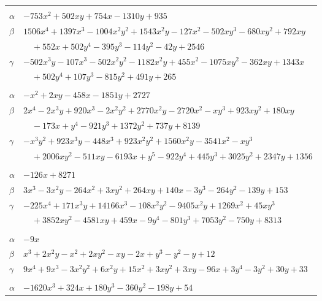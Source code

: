 \documentclass[11pt]{article}
\begin{document}
\begin{longtable}{@{}ll@{}}
\addlinespace[3pt]
\multicolumn{2}{@{}l}{$\{i,j\}=\{5,184\}$, $k_{ij}=2^{4}\cdot 3^{3}\cdot 13$}\\
$\alpha$ & $-753x^{2}+502xy+754x-1310y+935$\\
$\beta$ & $1506x^{4}+1397x^{3}-1004x^{2}y^{2}+1543x^{2}y-127x^{2}-502xy^{3}-680xy^{2}+792xy$\\
 & $\quad +552x+502y^{4}-395y^{3}-114y^{2}-42y+2546$\\
$\gamma$ & $-502x^{3}y-107x^{3}-502x^{2}y^{2}-1182x^{2}y+455x^{2}-1075xy^{2}-362xy+1343x$\\
 & $\quad +502y^{4}+107y^{3}-815y^{2}+491y+265$\\
\addlinespace[3pt]
\multicolumn{2}{@{}l}{$\{i,j\}=\{5,222\}$, $k_{ij}=2^{3}\cdot 3^{5}\cdot 7$}\\
$\alpha$ & $-x^{2}+2xy-458x-1851y+2727$\\
$\beta$ & $2x^{4}-2x^{3}y+920x^{3}-2x^{2}y^{2}+2770x^{2}y-2720x^{2}-xy^{3}+923xy^{2}+180xy$\\
 & $\quad -173x+y^{4}-921y^{3}+1372y^{2}+737y+8139$\\
$\gamma$ & $-x^{3}y^{2}+923x^{3}y-448x^{3}+923x^{2}y^{2}+1560x^{2}y-3541x^{2}-xy^{3}$\\
 & $\quad +2006xy^{2}-511xy-6193x+y^{5}-922y^{4}+445y^{3}+3025y^{2}+2347y+1356$\\
\addlinespace[3pt]
\multicolumn{2}{@{}l}{$\{i,j\}=\{6,37\}$, $k_{ij}=2^{3}\cdot 3^{5}\cdot 13$}\\
$\alpha$ & $-126x+8271$\\
$\beta$ & $3x^{3}-3x^{2}y-264x^{2}+3xy^{2}+264xy+140x-3y^{3}-264y^{2}-139y+153$\\
$\gamma$ & $-225x^{4}+171x^{3}y+14166x^{3}-108x^{2}y^{2}-9405x^{2}y+1269x^{2}+45xy^{3}$\\
 & $\quad +3852xy^{2}-4581xy+459x-9y^{4}-801y^{3}+7053y^{2}-750y+8313$\\
\addlinespace[3pt]
\multicolumn{2}{@{}l}{$\{i,j\}=\{6,54\}$, $k_{ij}=2^{2}\cdot 3^{2}$}\\
$\alpha$ & $-9x$\\
$\beta$ & $x^{3}+2x^{2}y-x^{2}+2xy^{2}-xy-2x+y^{3}-y^{2}-y+12$\\
$\gamma$ & $9x^{4}+9x^{3}-3x^{2}y^{2}+6x^{2}y+15x^{2}+3xy^{2}+3xy-96x+3y^{4}-3y^{2}+30y+33$\\
\addlinespace[3pt]
\multicolumn{2}{@{}l}{$\{i,j\}=\{6,130\}$, $k_{ij}=2^{2}\cdot 3^{5}\cdot 7$}\\
$\alpha$ & $-1620x^{3}+324x+180y^{3}-360y^{2}-198y+54$\\

\end{longtable}
\end{document}
